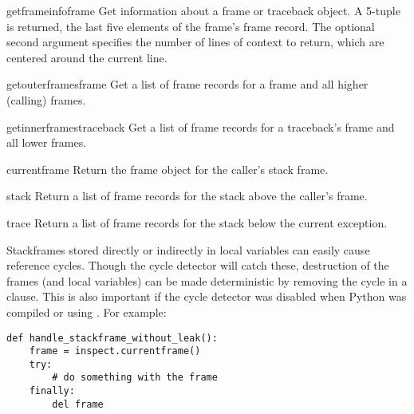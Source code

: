 
\begin{funcdesc}{getframeinfo}{frame}
  Get information about a frame or traceback object.  A 5-tuple
  is returned, the last five elements of the frame's frame record.
  The optional second argument specifies the number of lines of context
  to return, which are centered around the current line.
\end{funcdesc}

\begin{funcdesc}{getouterframes}{frame}
  Get a list of frame records for a frame and all higher (calling)
  frames.
\end{funcdesc}

\begin{funcdesc}{getinnerframes}{traceback}
  Get a list of frame records for a traceback's frame and all lower
  frames.
\end{funcdesc}

\begin{funcdesc}{currentframe}{}
  Return the frame object for the caller's stack frame.
\end{funcdesc}

\begin{funcdesc}{stack}{}
  Return a list of frame records for the stack above the caller's
  frame.
\end{funcdesc}

\begin{funcdesc}{trace}{}
  Return a list of frame records for the stack below the current
  exception.
\end{funcdesc}

Stackframes stored directly or indirectly in local variables can
easily cause reference cycles.  Though the cycle detector will catch
these, destruction of the frames (and local variables) can be made
deterministic by removing the cycle in a  clause.
This is also important if the cycle detector was disabled when Python
was compiled or using .  For example:

\begin{verbatim}
def handle_stackframe_without_leak():
    frame = inspect.currentframe()
    try:
        # do something with the frame
    finally:
        del frame
\end{verbatim}
